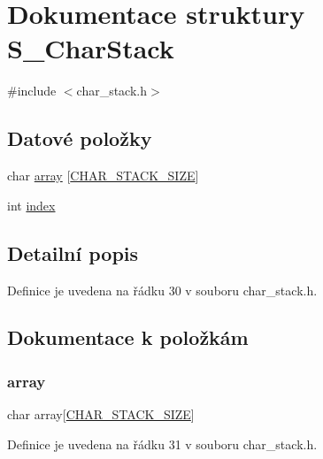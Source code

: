 \hypertarget{struct_s___char_stack}{}\section{Dokumentace struktury S\+\_\+\+Char\+Stack}
\label{struct_s___char_stack}


{\ttfamily \#include $<$char\+\_\+stack.\+h$>$}

\subsection*{Datové položky}
\begin{DoxyCompactItemize}
\item 
char \hyperlink{struct_s___char_stack_a5407c095147dea4e6b8b9cc5363a05b6}{array} \mbox{[}\hyperlink{char__stack_8h_a05cefbca68a3cd08af874e4c218984cb}{C\+H\+A\+R\+\_\+\+S\+T\+A\+C\+K\+\_\+\+S\+I\+ZE}\mbox{]}
\item 
int \hyperlink{struct_s___char_stack_a750b5d744c39a06bfb13e6eb010e35d0}{index}
\end{DoxyCompactItemize}


\subsection{Detailní popis}


Definice je uvedena na řádku 30 v souboru char\+\_\+stack.\+h.



\subsection{Dokumentace k položkám}
\mbox{\label{struct_s___char_stack_a5407c095147dea4e6b8b9cc5363a05b6}} 
\subsubsection{\texorpdfstring{array}{array}}
{\footnotesize\ttfamily char array\mbox{[}\hyperlink{char__stack_8h_a05cefbca68a3cd08af874e4c218984cb}{C\+H\+A\+R\+\_\+\+S\+T\+A\+C\+K\+\_\+\+S\+I\+ZE}\mbox{]}}



Definice je uvedena na řádku 31 v souboru char\+\_\+stack.\+h.

